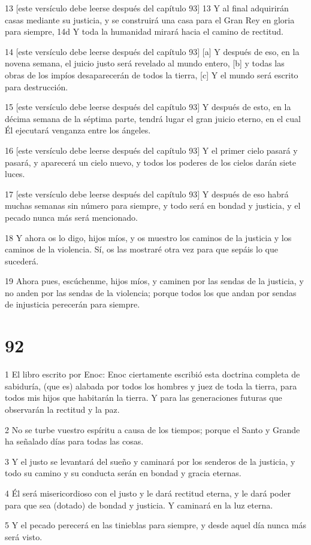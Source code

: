 \par 13 [este versículo debe leerse después del capítulo 93] 13 Y al final adquirirán casas mediante su justicia, y se construirá una casa para el Gran Rey en gloria para siempre, 14d Y toda la humanidad mirará hacia el camino de rectitud.
\par 14 [este versículo debe leerse después del capítulo 93] [a] Y después de eso, en la novena semana, el juicio justo será revelado al mundo entero, [b] y todas las obras de los impíos desaparecerán de todos la tierra, [c] Y el mundo será escrito para destrucción.
\par 15 [este versículo debe leerse después del capítulo 93] Y después de esto, en la décima semana de la séptima parte, tendrá lugar el gran juicio eterno, en el cual Él ejecutará venganza entre los ángeles.
\par 16 [este versículo debe leerse después del capítulo 93] Y el primer cielo pasará y pasará, y aparecerá un cielo nuevo, y todos los poderes de los cielos darán siete luces.
\par 17 [este versículo debe leerse después del capítulo 93] Y después de eso habrá muchas semanas sin número para siempre, y todo será en bondad y justicia, y el pecado nunca más será mencionado.
\par 18 Y ahora os lo digo, hijos míos, y os muestro los caminos de la justicia y los caminos de la violencia. Sí, os las mostraré otra vez para que sepáis lo que sucederá.
\par 19 Ahora pues, escúchenme, hijos míos, y caminen por las sendas de la justicia, y no anden por las sendas de la violencia; porque todos los que andan por sendas de injusticia perecerán para siempre.

\chapter{92}

\par 1 El libro escrito por Enoc: Enoc ciertamente escribió esta doctrina completa de sabiduría, (que es) alabada por todos los hombres y juez de toda la tierra, para todos mis hijos que habitarán la tierra. Y para las generaciones futuras que observarán la rectitud y la paz.
\par 2 No se turbe vuestro espíritu a causa de los tiempos; porque el Santo y Grande ha señalado días para todas las cosas.
\par 3 Y el justo se levantará del sueño y caminará por los senderos de la justicia, y todo su camino y su conducta serán en bondad y gracia eternas.
\par 4 Él será misericordioso con el justo y le dará rectitud eterna, y le dará poder para que sea (dotado) de bondad y justicia. Y caminará en la luz eterna.
\par 5 Y el pecado perecerá en las tinieblas para siempre, y desde aquel día nunca más será visto.

